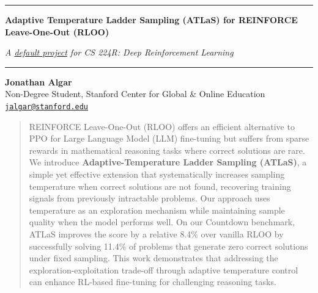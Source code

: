 \documentclass{article}
\begin{document}

\begin{center}
\rule{\linewidth}{1.5pt}
\vspace{0.8em}

\hspace{0.5em}%
{\Large\bfseries Adaptive Temperature Ladder Sampling (ATLaS) for REINFORCE Leave-One-Out (RLOO) \par}
\vspace{0.6em}

\textit{A \href{https://cs224r.stanford.edu/material/CS224R_Default_Project_Guidelines.pdf}{default project} for CS 224R: Deep Reinforcement Learning}

\vspace{0.8em}
\rule{\linewidth}{1.5pt}
\end{center}

\begin{center}
\textbf{Jonathan Algar} \\[0.5em]
Non-Degree Student, Stanford Center for Global \& Online Education\\[0.3em]
\texttt{\href{mailto:jonathan.algar@stanford.edu}{jalgar@stanford.edu}}
\end{center}


\begin{abstract}
REINFORCE Leave-One-Out (RLOO) offers an efficient alternative to PPO for Large Language Model (LLM) fine-tuning but suffers from sparse rewards in mathematical reasoning tasks where correct solutions are rare. We introduce \textbf{Adaptive-Temperature Ladder Sampling (ATLaS)}, a simple yet effective extension that systematically increases sampling temperature when correct solutions are not found, recovering training signals from previously intractable problems. Our approach uses temperature as an exploration mechanism while maintaining sample quality when the model performs well. On our Countdown benchmark, ATLaS improves the score by a relative 8.4\% over vanilla RLOO by successfully solving 11.4\% of problems that generate zero correct solutions under fixed sampling. This work demonstrates that addressing the exploration-exploitation trade-off through adaptive temperature control can enhance RL-based fine-tuning for challenging reasoning tasks.
\end{abstract}
\end{document}
